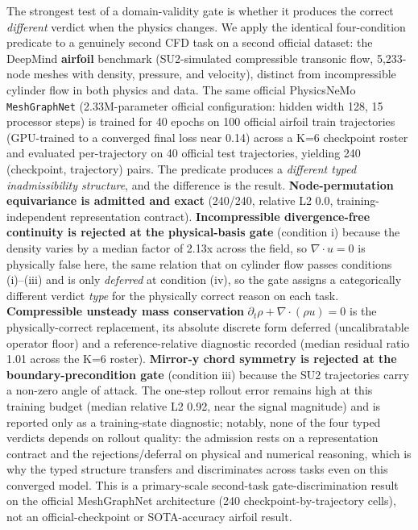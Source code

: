 \documentclass[preprint,12pt]{elsarticle}
\begin{document}
The strongest test of a domain-validity gate is whether it produces the correct \emph{different} verdict when the physics changes. We apply the identical four-condition predicate to a genuinely second CFD task on a second official dataset: the DeepMind \textbf{airfoil} benchmark (SU2-simulated compressible transonic flow, 5{,}233-node meshes with density, pressure, and velocity), distinct from incompressible cylinder flow in both physics and data. The same official PhysicsNeMo \texttt{MeshGraphNet} (2.33M-parameter official configuration: hidden width 128, 15 processor steps) is trained for 40 epochs on 100 official airfoil train trajectories (GPU-trained to a converged final loss near 0.14) across a K=6 checkpoint roster and evaluated per-trajectory on 40 official test trajectories, yielding 240 (checkpoint, trajectory) pairs. The predicate produces a \emph{different typed inadmissibility structure}, and the difference is the result. \textbf{Node-permutation equivariance is admitted and exact} (240/240, relative L2 0.0, training-independent representation contract). \textbf{Incompressible divergence-free continuity is rejected at the physical-basis gate} (condition i) because the density varies by a median factor of 2.13x across the field, so $\nabla\cdot u=0$ is physically false here, the same relation that on cylinder flow passes conditions (i)--(iii) and is only \emph{deferred} at condition (iv), so the gate assigns a categorically different verdict \emph{type} for the physically correct reason on each task. \textbf{Compressible unsteady mass conservation} $\partial_t\rho+\nabla\cdot(\rho u)=0$ is the physically-correct replacement, its absolute discrete form deferred (uncalibratable operator floor) and a reference-relative diagnostic recorded (median residual ratio 1.01 across the K=6 roster). \textbf{Mirror-y chord symmetry is rejected at the boundary-precondition gate} (condition iii) because the SU2 trajectories carry a non-zero angle of attack. The one-step rollout error remains high at this training budget (median relative L2 0.92, near the signal magnitude) and is reported only as a training-state diagnostic; notably, none of the four typed verdicts depends on rollout quality: the admission rests on a representation contract and the rejections/deferral on physical and numerical reasoning, which is why the typed structure transfers and discriminates across tasks even on this converged model. This is a primary-scale second-task gate-discrimination result on the official MeshGraphNet architecture (240 checkpoint-by-trajectory cells), not an official-checkpoint or SOTA-accuracy airfoil result.
\end{document}

